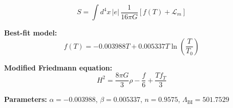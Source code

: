
\begin{equation}
  S = \int d^4x \, |e| \, \frac{1}{16\pi G} \left[ f(T) + \mathcal{L}_m \right]
\end{equation}

\textbf{Best-fit model:}
\begin{equation}
  f(T) = -0.003988 T + 0.005337 T \ln\!\left(\frac{T}{T_0}\right)
\end{equation}

\textbf{Modified Friedmann equation:}
\begin{equation}
  H^2 = \frac{8\pi G}{3} \rho - \frac{f}{6} + \frac{T f_T}{3}
\end{equation}

\textbf{Parameters:}
$\alpha = -0.003988$, \quad
$\beta = 0.005337$, \quad
$n = 0.9575$, \quad
$\Lambda_{\text{BI}} = 501.7529$